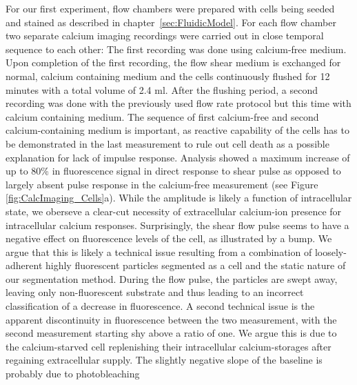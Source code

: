 For our first experiment, flow chambers were prepared with cells being seeded and stained as described in chapter~\vref{sec:FluidicModel}. For each flow chamber two separate calcium imaging recordings were carried out in close temporal sequence to each other: The first recording was done using calcium-free medium. Upon completion of the first recording, the flow shear medium is exchanged for normal, calcium containing medium and the cells continuously flushed for 12 minutes with a total volume of 2.4 ml. After the flushing period, a second recording was done with the previously used flow rate protocol but this time with calcium containing medium. The sequence of first calcium-free and second calcium-containing medium is important, as reactive capability of the cells has to be demonstrated in the last measurement to rule out cell death as a possible explanation for lack of impulse response. Analysis showed a maximum increase of up to 80\% in fluorescence signal in direct response to shear pulse as opposed to largely absent pulse response in the calcium-free measurement (see Figure \ref{fig:CalcImaging_Cells}a). While the amplitude is likely a function of intracellular state, we oberseve a clear-cut necessity of extracellular calcium-ion presence for intracellular calcium responses. Surprisingly, the shear flow pulse seems to have a negative effect on fluorescence levels of the cell, as illustrated by a bump. We argue that this is likely a technical issue resulting from a combination of loosely-adherent highly fluorescent particles segmented as a cell and the static nature of our segmentation method. During the flow pulse, the particles are swept away, leaving only non-fluorescent substrate and thus leading to an incorrect classification of a decrease in fluorescence. A second technical issue is the apparent discontinuity in fluorescence between the two measurement, with the second measurement starting shy above a ratio of one. We argue this is due to the calcium-starved cell replenishing their intracellular calcium-storages after regaining extracellular supply. The slightly negative slope of the baseline is probably due to photobleaching

